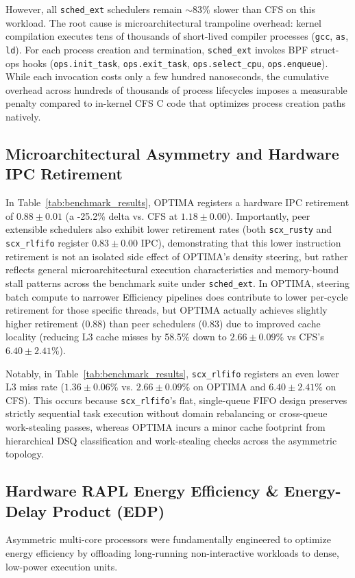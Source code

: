 \documentclass[letterpaper,twocolumn,10pt]{article}
\begin{document}
However, all \texttt{sched\_ext} schedulers remain $\sim$83\% slower than CFS on this workload. The root cause is microarchitectural trampoline overhead: kernel compilation executes tens of thousands of short-lived compiler processes (\texttt{gcc}, \texttt{as}, \texttt{ld}). For each process creation and termination, \texttt{sched\_ext} invokes BPF struct-ops hooks (\texttt{ops.init\_task}, \texttt{ops.exit\_task}, \texttt{ops.select\_cpu}, \texttt{ops.enqueue}). While each invocation costs only a few hundred nanoseconds, the cumulative overhead across hundreds of thousands of process lifecycles imposes a measurable penalty compared to in-kernel CFS C code that optimizes process creation paths natively.

\subsection{Microarchitectural Asymmetry and Hardware IPC Retirement}
In Table~\ref{tab:benchmark_results}, OPTIMA registers a hardware IPC retirement of $0.88 \pm 0.01$ (a -25.2\% delta vs. CFS at $1.18 \pm 0.00$). Importantly, peer extensible schedulers also exhibit lower retirement rates (both \texttt{scx\_rusty} and \texttt{scx\_rlfifo} register $0.83 \pm 0.00$ IPC), demonstrating that this lower instruction retirement is not an isolated side effect of OPTIMA's density steering, but rather reflects general microarchitectural execution characteristics and memory-bound stall patterns across the benchmark suite under \texttt{sched\_ext}. In OPTIMA, steering batch compute to narrower Efficiency pipelines does contribute to lower per-cycle retirement for those specific threads, but OPTIMA actually achieves slightly higher retirement ($0.88$) than peer schedulers ($0.83$) due to improved cache locality (reducing L3 cache misses by 58.5\% down to $2.66 \pm 0.09\%$ vs CFS's $6.40 \pm 2.41\%$).

Notably, in Table~\ref{tab:benchmark_results}, \texttt{scx\_rlfifo} registers an even lower L3 miss rate ($1.36 \pm 0.06\%$ vs. $2.66 \pm 0.09\%$ on OPTIMA and $6.40 \pm 2.41\%$ on CFS). This occurs because \texttt{scx\_rlfifo}'s flat, single-queue FIFO design preserves strictly sequential task execution without domain rebalancing or cross-queue work-stealing passes, whereas OPTIMA incurs a minor cache footprint from hierarchical DSQ classification and work-stealing checks across the asymmetric topology.

\subsection{Hardware RAPL Energy Efficiency \& Energy-Delay Product (EDP)}
\label{sec:rapl_analysis}
Asymmetric multi-core processors were fundamentally engineered to optimize energy efficiency by offloading long-running non-interactive workloads to dense, low-power execution units.
\end{document}
